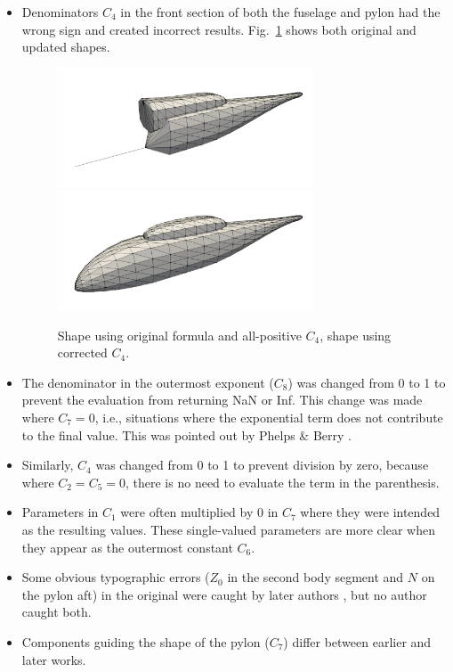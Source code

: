 \documentclass{ahs}
\begin{document}
\begin{itemize}
\item Denominators $C_{4}$ in the front section of both the fuselage and pylon had the wrong sign
and created incorrect results.
Fig.~\ref{badc4} shows both original and updated shapes.
\begin{figure} \begin{centering}
\includegraphics[width=3.0in]{img_badc4.png}
\includegraphics[width=3.0in]{img_good.png}
\caption{Shape using original formula and all-positive $C_4$, shape using corrected $C_4$.}
\label{badc4}
\end{centering}\end{figure}%
\item The denominator in the outermost exponent ($C_{8}$) was changed from 0 to 1 to prevent the evaluation from returning NaN or Inf.
This change was made where $C_{7}=0$, i.e., situations where the exponential term does not contribute to the final value.
This was pointed out by Phelps \& Berry \cite{nasa87762}.
\item Similarly, $C_{4}$ was changed from 0 to 1 to prevent division by zero, because
where $C_{2}=C_{5}=0$, there is no need to evaluate the term in the parenthesis.
\item Parameters in $C_{1}$ were often multiplied by 0 in $C_{7}$ where they were intended as the resulting values.
These single-valued parameters are more clear when they appear as the outermost constant $C_{6}$.
\item Some obvious typographic errors ($Z_0$ in the second body segment and $N$ on the pylon aft)
in the original \cite{nasa80051} were caught by later authors \cite{nasa87762,mineckgorton}, but no author caught both.
\item Components guiding the shape of the pylon ($C_{7}$) differ between earlier and later works.

\end{itemize}
\end{document}
